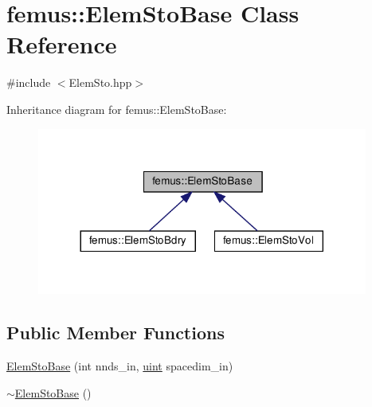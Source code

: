 \hypertarget{classfemus_1_1_elem_sto_base}{}\section{femus\+:\+:Elem\+Sto\+Base Class Reference}
\label{classfemus_1_1_elem_sto_base}


{\ttfamily \#include $<$Elem\+Sto.\+hpp$>$}



Inheritance diagram for femus\+:\+:Elem\+Sto\+Base\+:
\nopagebreak
\begin{figure}[H]
\begin{center}
\leavevmode
\includegraphics[width=308pt]{classfemus_1_1_elem_sto_base__inherit__graph}
\end{center}
\end{figure}
\subsection*{Public Member Functions}
\begin{DoxyCompactItemize}
\item 
\mbox{\hyperlink{classfemus_1_1_elem_sto_base_ae6f3488589787d622037253092ce95b4}{Elem\+Sto\+Base}} (int nnds\+\_\+in, \mbox{\hyperlink{_typedefs_8hpp_a91ad9478d81a7aaf2593e8d9c3d06a14}{uint}} spacedim\+\_\+in)
\item 
\mbox{\hyperlink{classfemus_1_1_elem_sto_base_a53ccb54619040fb0b77429bb89900a16}{$\sim$\+Elem\+Sto\+Base}} ()
\end{DoxyCompactItemize}
